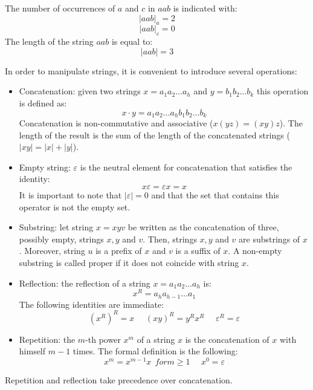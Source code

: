 \documentclass[12pt, a4paper]{report}
\newtheorem[style=M,bodystyle=\normalfont]{theorem}{Theorem}
\newtheorem[style=M,bodystyle=\normalfont]{corollary}{Corollary}
\newtheorem[style=M,bodystyle=\normalfont]{lemma}{Lemma}
\newtheorem[style=M,bodystyle=\normalfont]{definition}{Definition}
\begin{document}
    \begin{example}
        The number of occurrences of $a$ and $c$ in $aab$ is indicated with:
        \[{\left\lvert aab \right\rvert}_a = 2\]
        \[{\left\lvert aab \right\rvert}_c = 0\]
        The length of the string $aab$ is equal to: 
        \[\left\lvert aab \right\rvert = 3\]
    \end{example}
    In order to manipulate strings, it is convenient to introduce several operations:
    \begin{itemize}
        \item Concatenation: given two strings $x=a_1a_2\dots a_h$ and $y=b_1b_2\dots b_k$ this operation is defined as:
            \[x \cdot y = a_1a_2\dots a_h b_1b_2\dots b_k\]
            Concatenation is non-commutative and associative ($x(yz)=(xy)z$). The length of the result is the sum of the length of the concatenated strings
             ($\left\lvert xy \right\rvert = \left\lvert x \right\rvert + \left\lvert y \right\rvert$). 
        \item Empty string: $\varepsilon$ is the neutral element for concatenation that satisfies the identity:
            \[x\varepsilon=\varepsilon x=x\]
            It is important to note that $\left\lvert \varepsilon \right\rvert = 0$ and that the set that contains this operator is not the empty set. 
        \item Substring: let string $x=xyv$ be written as the concatenation of three, possibly empty, strings $x,y$ and $v$. Then, strings $x,y$ and $v$ are substrings of $x$. 
            Moreover, string $u$ is a prefix of $x$ and $v$ is a suffix of $x$. A non-empty substring is called proper if it does not coincide with string $x$. 
        \item Reflection: the reflection of a string $x=a_1a_2\dots a_h$ is:
            \[x^R=a_ha_{h-1}\dots a_1\]
            The following identities are immediate: 
            \[(x^R)^R=x \:\:\:\:\:\: (xy)^R=y^Rx^R \:\:\:\:\:\: \varepsilon^R=\varepsilon\]
        \item Repetition: the $m$-th power $x^m$ of a string $x$ is the concatenation of $x$ with himself $m-1$ times. The formal definition is the following: 
            \[x^m=x^{m-1}x \:\: for m \geq 1 \:\:\:\:\:\: x^0=\varepsilon\]
    \end{itemize}
    Repetition and reflection take precedence over concatenation. 
\end{document}

